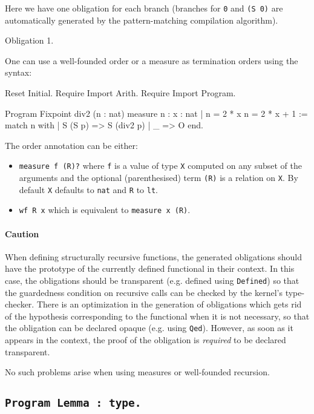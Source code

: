 Here we have one obligation for each branch (branches for \verb:0: and \verb:(S 0): are
automatically generated by the pattern-matching compilation algorithm).
\begin{coq_example}
  Obligation 1.
\end{coq_example}

One can use a well-founded order or a measure as termination orders using the syntax:
\begin{coq_eval}
Reset Initial.
Require Import Arith.
Require Import Program.
\end{coq_eval}
\begin{coq_example*}
Program Fixpoint div2 (n : nat) {measure n} :
  { x : nat | n = 2 * x \/ n = 2 * x + 1 } :=
  match n with
  | S (S p) => S (div2 p)
  | _ => O
  end.
\end{coq_example*}

The order annotation can be either:
\begin{itemize}
\item {\tt measure f (R)?} where {\tt f} is a value of type {\tt X}
  computed on any subset of the arguments and the optional
  (parenthesised) term {\tt (R)} is a relation
  on {\tt X}. By default {\tt X} defaults to {\tt nat} and {\tt R} to
  {\tt lt}.
\item {\tt wf R x} which is equivalent to {\tt measure x (R)}.
\end{itemize}

\paragraph{Caution}
When defining structurally recursive functions, the
generated obligations should have the prototype of the currently defined functional
in their context. In this case, the obligations should be transparent
(e.g. defined using {\tt Defined}) so that the guardedness condition on
recursive calls can be checked by the
kernel's type-checker. There is an optimization in the generation of
obligations which gets rid of the hypothesis corresponding to the
functional when it is not necessary, so that the obligation can be
declared opaque (e.g. using {\tt Qed}). However, as soon as it appears in the
context, the proof of the obligation is \emph{required} to be declared transparent.

No such problems arise when using measures or well-founded recursion.

\subsection{\tt Program Lemma {\ident} : type.
  \label{ProgramLemma}}

